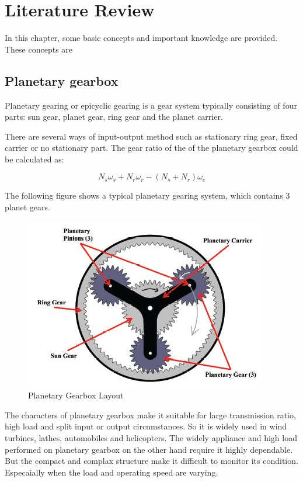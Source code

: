 \chapter{Literature Review}\label{ch:literature}

In this chapter, some basic concepts and important knowledge are provided. These concepts are 

\section{Planetary gearbox}

Planetary gearing or epicyclic gearing is a gear system typically consisting of four parts: sun gear, planet gear, ring gear and the planet carrier.

There are several ways of input-output method such as stationary ring gear, fixed carrier or no stationary part. The gear ratio of the of the planetary gearbox could be calculated as:

\begin{equation}
	N_s\omega_s + N_r\omega_r - (N_s + N_r)\omega_c
\end{equation}

The following figure shows a typical planetary gearing system, which contains 3 planet gears.


\begin{figure}
	\centering
	\includegraphics{PGB}
	\caption{Planetary Gearbox Layout\cite{gearbox}}
	\label{simulationfigure}
\end{figure}

The characters of planetary gearbox make it suitable for large transmission ratio, high load and split input or output circumstances. So it is widely used in wind turbines, lathes, automobiles and helicopters. The widely appliance and high load performed on planetary gearbox on the other hand require it highly dependable. But the compact and complax structure make it difficult to monitor its condition. Especaially when the load and operating speed are varying.











